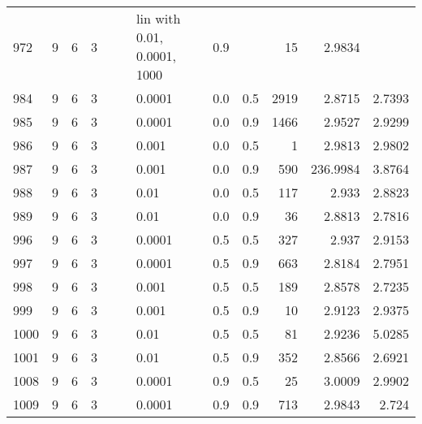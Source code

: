 \begin{longtable}{lrrrrrlrrrrr}
 972 &       9 & 6 & 3 &   &   & lin with 0.01, 0.0001, 1000 &  0.9 &        &      15 &                 2.9834 &                        \\
 984 &       9 & 6 & 3 &   &   &                      0.0001 &  0.0 &    0.5 &    2919 &                 2.8715 &                 2.7393 \\
 985 &       9 & 6 & 3 &   &   &                      0.0001 &  0.0 &    0.9 &    1466 &                 2.9527 &                 2.9299 \\
 986 &       9 & 6 & 3 &   &   &                       0.001 &  0.0 &    0.5 &       1 &                 2.9813 &                 2.9802 \\
 987 &       9 & 6 & 3 &   &   &                       0.001 &  0.0 &    0.9 &     590 &               236.9984 &                 3.8764 \\
 988 &       9 & 6 & 3 &   &   &                        0.01 &  0.0 &    0.5 &     117 &                  2.933 &                 2.8823 \\
 989 &       9 & 6 & 3 &   &   &                        0.01 &  0.0 &    0.9 &      36 &                 2.8813 &                 2.7816 \\
 996 &       9 & 6 & 3 &   &   &                      0.0001 &  0.5 &    0.5 &     327 &                  2.937 &                 2.9153 \\
 997 &       9 & 6 & 3 &   &   &                      0.0001 &  0.5 &    0.9 &     663 &                 2.8184 &                 2.7951 \\
 998 &       9 & 6 & 3 &   &   &                       0.001 &  0.5 &    0.5 &     189 &                 2.8578 &                 2.7235 \\
 999 &       9 & 6 & 3 &   &   &                       0.001 &  0.5 &    0.9 &      10 &                 2.9123 &                 2.9375 \\
1000 &       9 & 6 & 3 &   &   &                        0.01 &  0.5 &    0.5 &      81 &                 2.9236 &                 5.0285 \\
1001 &       9 & 6 & 3 &   &   &                        0.01 &  0.5 &    0.9 &     352 &                 2.8566 &                 2.6921 \\
1008 &       9 & 6 & 3 &   &   &                      0.0001 &  0.9 &    0.5 &      25 &                 3.0009 &                 2.9902 \\
1009 &       9 & 6 & 3 &   &   &                      0.0001 &  0.9 &    0.9 &     713 &                 2.9843 &                  2.724 \\

\end{longtable}
